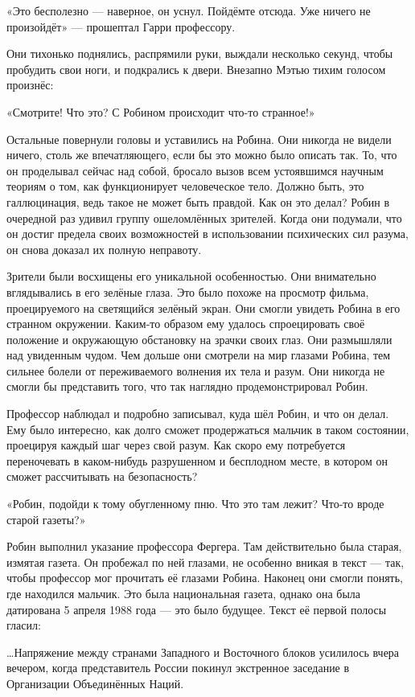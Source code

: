 \documentclass[a5paper, 9pt,
final, openany, twoside=true]{memoir}
\begin{document}
«Это бесполезно — наверное, он уснул. Пойдёмте отсюда. Уже ничего не произойдёт» — прошептал Гарри профессору.

Они тихонько поднялись, распрямили руки, выждали несколько секунд, чтобы пробудить свои ноги, и подкрались к двери. Внезапно Мэтью тихим голосом произнёс:

«Смотрите! Что это? С Робином происходит что-то странное!»

Остальные повернули головы и уставились на Робина. Они никогда не видели ничего, столь же впечатляющего, если бы это можно было описать так. То, что он проделывал сейчас над собой, бросало вызов всем устоявшимся научным теориям о том, как функционирует человеческое тело. Должно быть, это галлюцинация, ведь такое не может быть правдой. Как он это делал? Робин в очередной раз удивил группу ошеломлённых зрителей. Когда они подумали, что он достиг предела своих возможностей в использовании психических сил разума, он снова доказал их полную неправоту.\bigskip

Зрители были восхищены его уникальной особенностью. Они внимательно вглядывались в его зелёные глаза. Это было похоже на просмотр фильма, проецируемого на светящийся зелёный экран. Они смогли увидеть Робина в его странном окружении. Каким-то образом ему удалось спроецировать своё положение и окружающую обстановку на зрачки своих глаз. Они размышляли над увиденным чудом. Чем дольше они смотрели на мир глазами Робина, тем сильнее болели от переживаемого волнения их тела и разум. Они никогда не смогли бы представить того, что так наглядно продемонстрировал Робин.\bigskip

Профессор наблюдал и подробно записывал, куда шёл Робин, и что он делал. Ему было интересно, как долго сможет продержаться мальчик в таком состоянии, проецируя каждый шаг через свой разум. Как скоро ему потребуется переночевать в каком-нибудь разрушенном и бесплодном месте, в котором он сможет рассчитывать на безопасность?

«Робин, подойди к тому обугленному пню. Что это там лежит? Что-то вроде старой газеты?»

Робин выполнил указание профессора Фергера. Там действительно была старая, измятая газета. Он пробежал по ней глазами, не особенно вникая в текст — так, чтобы профессор мог прочитать её глазами Робина. Наконец они смогли понять, где находился мальчик. Это была национальная газета, однако она была датирована 5 апреля 1988 года — это было будущее. Текст её первой полосы гласил:\bigskip

…Напряжение между странами Западного и Восточного блоков усилилось вчера вечером, когда представитель России покинул экстренное заседание в Организации Объединённых Наций.
\end{document}
